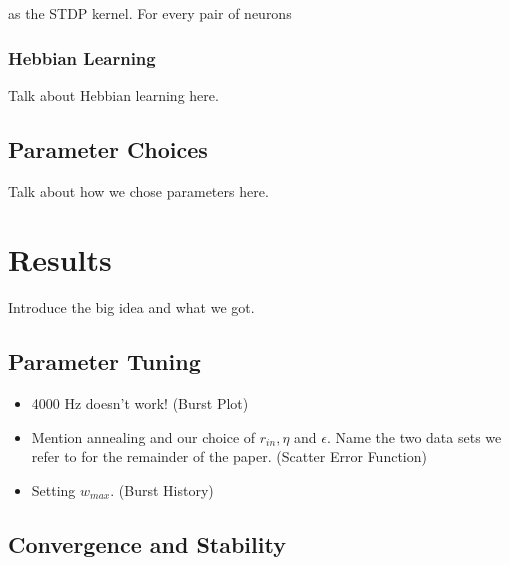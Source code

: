 \documentclass[12pt, final]{article}
\begin{document}
as the STDP kernel. For every pair of neurons

\subsubsection{Hebbian Learning}

Talk about Hebbian learning here.

\subsection{Parameter Choices}

Talk about how we chose parameters here.

\section{Results}

Introduce the big idea and what we got.

\subsection{Parameter Tuning}

\begin{itemize}
\item 4000 Hz doesn't work! (Burst Plot)

\item Mention annealing and our choice of \(r_{in}, \eta\) and \(\epsilon\). Name the two data sets we refer to for the remainder of the paper. (Scatter Error Function)

\item Setting \(w_{max}\). (Burst History)
\end{itemize}

\subsection{Convergence and Stability}
\end{document}

